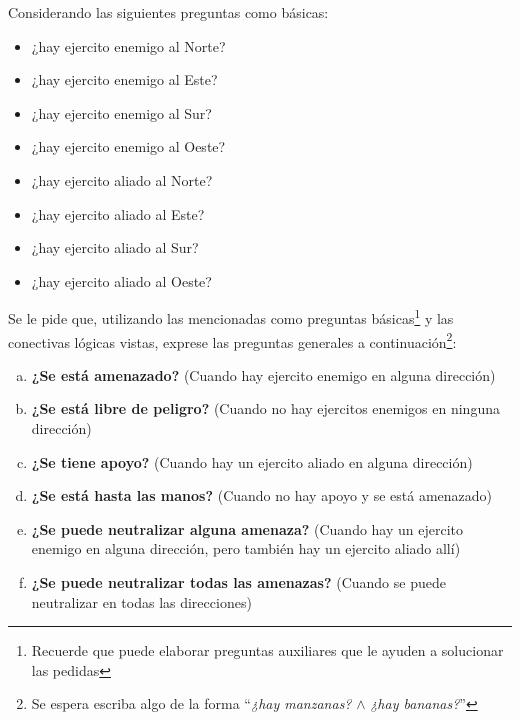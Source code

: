 \begin{exercise}
    Considerando las siguientes preguntas como básicas:

    \begin{minipage}{0.45\textwidth}
        \begin{itemize}
            \item ¿hay ejercito enemigo al Norte?
            \item ¿hay ejercito enemigo al Este?
            \item ¿hay ejercito enemigo al Sur?
            \item ¿hay ejercito enemigo al Oeste?
        \end{itemize}
    \end{minipage}
    \begin{minipage}{0.45\textwidth}
        \begin{itemize}
            \item ¿hay ejercito aliado al Norte?
            \item ¿hay ejercito aliado al Este?
            \item ¿hay ejercito aliado al Sur?
            \item ¿hay ejercito aliado al Oeste?
        \end{itemize}
    \end{minipage}

    Se le pide que, utilizando las mencionadas como preguntas básicas\footnote{
        Recuerde que puede elaborar preguntas auxiliares que le ayuden a
        solucionar las pedidas } y las conectivas lógicas vistas, exprese las
        preguntas generales a continuación\footnote{ Se espera escriba algo de
        la forma ``\textit{¿hay manzanas?} $\land$ \textit{¿hay bananas?}'' }:
    \begin{enumerate}[a)]
        \item \textbf{¿Se está amenazado?} (Cuando hay ejercito enemigo en
        alguna dirección)
        \item \textbf{¿Se está libre de peligro?} (Cuando no hay ejercitos
        enemigos en ninguna dirección)
        \item \textbf{¿Se tiene apoyo?} (Cuando hay un ejercito aliado en alguna
        dirección)
        \item \textbf{¿Se está hasta las manos?} (Cuando no hay apoyo y se está
        amenazado)
        \item \textbf{¿Se puede neutralizar alguna amenaza?} (Cuando hay un
        ejercito enemigo en alguna dirección, pero también hay un ejercito
        aliado allí)
        \item \textbf{¿Se puede neutralizar todas las amenazas?} (Cuando se
        puede neutralizar en todas las direcciones)
    \end{enumerate}
\end{exercise}

